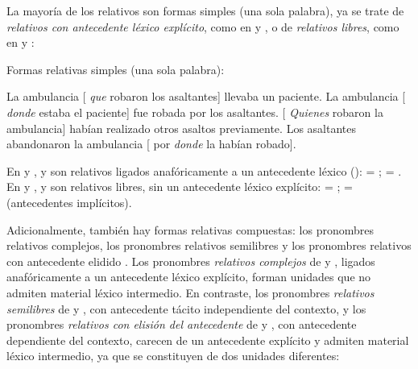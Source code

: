 \begin{recuadro}
La mayoría de los relativos son formas simples (una sola palabra), ya se trate de
\textit{relativos con antecedente léxico explícito}, como en
 y , o de \textit{relativos
libres}, como en  y :

\begin{exe}
  \ex Formas relativas simples (una sola palabra):
    \begin{xlist}
      \ex\label{ex:13-ambulancia-a} La ambulancia [ \textit{que}
          robaron los asaltantes] llevaba un paciente.
      \ex\label{ex:13-ambulancia-b} La ambulancia [ \textit{donde}
          estaba el paciente] fue robada por los asaltantes.
      \ex\label{ex:13-ambulancia-c} [ \textit{Quienes} robaron la
          ambulancia] habían realizado otros asaltos previamente.
      \ex\label{ex:13-ambulancia-d} Los asaltantes abandonaron la ambulancia
          [ por \textit{donde} la habían robado].
    \end{xlist}
\end{exe}

En  y ,  y
 son relativos ligados anafóricamente a un antecedente léxico
():  = ;  = . En  y ,
 y  son relativos libres, sin un antecedente léxico
explícito:  = ;  =  (antecedentes implícitos).

Adicionalmente, también hay formas relativas compuestas: los pronombres relativos
complejos, los pronombres relativos semilibres y los pronombres relativos con
antecedente elidido \parencite[§\,44.1d--g]{rae2025}. Los pronombres
\textit{relativos complejos} de  y
, ligados anafóricamente a un antecedente léxico
explícito, forman unidades que no admiten material léxico intermedio. En
contraste, los pronombres \textit{relativos semilibres} de
 y , con antecedente tácito
independiente del contexto, y los pronombres \textit{relativos con elisión del
antecedente} de  y , con
antecedente dependiente del contexto, carecen de un antecedente explícito y
admiten material léxico intermedio, ya que se constituyen de dos unidades
diferentes:


\end{recuadro}
